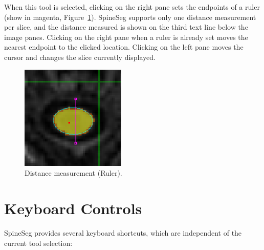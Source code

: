 \documentclass[12pt]{report}
\begin{document}
When this tool is selected, clicking on the right pane sets the
endpoints of a ruler (show in magenta, Figure~\ref{f.ruler}). SpineSeg
supports only one distance measurement per slice, and the distance
measured is shown on the third text line below the image panes.
Clicking on the right pane when a ruler is already set moves the
nearest endpoint to the clicked location.  Clicking on the left pane
moves the cursor and changes the slice currently displayed.

\begin{figure}[!htb]
\begin{center}
\includegraphics[width=5cm]{ruler.eps}
\caption{Distance measurement (Ruler).}
\label{f.ruler}
\end{center}
\end{figure}

\newpage
\section{Keyboard Controls}

SpineSeg provides several keyboard shortcuts, which are independent of the
current tool selection:
\end{document}
